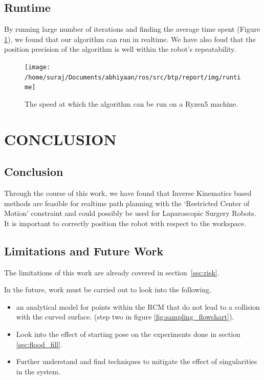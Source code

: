 \documentclass[BTech]{iitmdiss}
\begin{document}
    \section{Runtime}

    By running large number of iterations and finding the average time spent (Figure \ref{fig:runtime}), we found that our algorithm can run in
    realtime.
    We have also foud that the position precision of the algorithm is well within the robot's repeatability.
    \begin{figure}
        \centering
        \texttt{[image: /home/suraj/Documents/abhiyaan/ros/src/btp/report/img/runtime]}
        \caption{The speed at which the algorithm can be run on a Ryzen5 machine.}
        \label{fig:runtime}
    \end{figure}


    \chapter{CONCLUSION}\label{ch:conclusion}


    \section{Conclusion}

    Through the course of this work, we have found that Inverse Kinematics based methods are feasible for realtime path planning with the
    `Restricted Center of Motion' constraint and could possibly be used for Laparoscopic Surgery Robots.
    It is important to correctly position the robot with respect to the workspace.


    \section{Limitations and Future Work}

    The limitations of this work are already covered in section~\ref{sec:risk}.

    \noindent In the future, work must be carried out to look into the following.
    \begin{itemize}
        \item  an analytical model for points within the RCM that do not lead to a collision with the curved surface.
        (step two in figure \ref{fig:sampling_flowchart}).
        \item Look into the effect of starting pose on the experiments done in section \ref{sec:flood_fill}.
        \item Further understand and find techniques to mitigate the effect of singularities in the system.
    \end{itemize}
\end{document}
